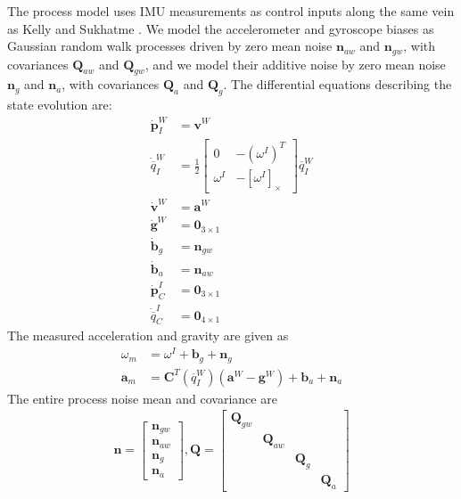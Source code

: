 \documentclass[letterpaper]{article}
\newcommand{\bb}[1]{\mathbf{#1}}
\begin{document}
The process model uses IMU measurements as control inputs along the same
vein as Kelly and Sukhatme \cite{2011:kelly:article}. We model the accelerometer and
gyroscope biases as Gaussian random walk processes driven by zero mean
noise $\bb{n}_{aw}$ and $\bb{n}_{gw}$, with covariances $\bb{Q}_{aw}$
and $\bb{Q}_{gw}$, and we model their additive noise by zero mean
noise $\bb{n}_g$ and $\bb{n}_a$, with covariances $\bb{Q}_a$ and
$\bb{Q}_g$. The differential equations describing the state evolution
are:
\begin{align}
\dot{\bb{p}}_I^W &=\bb{v}^W \\ 
\dot{\overline{q}}_I^W&=\frac{1}{2}\begin{bmatrix}0 & -(\omega^I)^T \\ \omega^I & -[ \omega^I ]_{\times} \end{bmatrix} \overline{q}_I^W \nonumber\\
\dot{\bb{v}}^W &=\bb{a}^W  \nonumber\\
\dot{\bb{g}}^W &=\bb{0}_{3 \times 1}  \nonumber\\
\dot{\bb{b}}_g&=\bb{n}_{gw}  \nonumber\\
\dot{\bb{b}}_a&=\bb{n}_{aw}  \nonumber\\
\dot{\bb{p}}_C^I&=\bb{0}_{3 \times 1} \nonumber\\
\dot{\overline{q}}_C^I&=\bb{0}_{4 \times 1} \nonumber
\end{align}
The measured acceleration and gravity are given as
\begin{align}
\omega_m&=\omega^I+\bb{b}_g+\bb{n}_g  \\
\bb{a}_m&=\bb{C}^T(\overline{q}_I^W)(\bb{a}^W-\bb{g}^W)+\bb{b}_a+\bb{n}_a \nonumber
\end{align}
The entire process noise mean and covariance are
\begin{align}
\bb{n}=\begin{bmatrix} \bb{n}_{gw} \\ \bb{n}_{aw} \\ \bb{n}_g\\ \bb{n}_a \end{bmatrix}, \bb{Q}=\begin{bmatrix} \bb{Q}_{gw} & & & \\ & \bb{Q}_{aw} & & \\ & & \bb{Q}_g & \\ & & & \bb{Q}_a \end{bmatrix}
\end{align}
\end{document}
